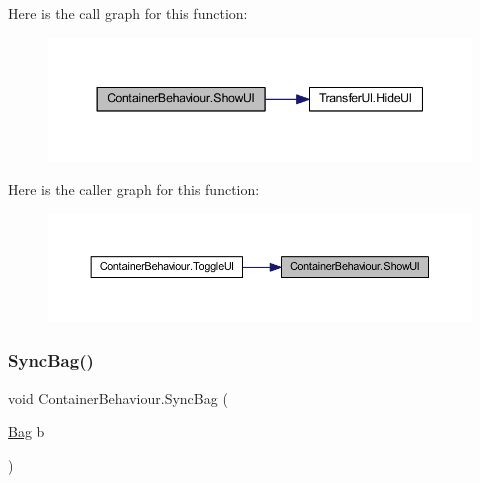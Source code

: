 Here is the call graph for this function\+:\nopagebreak
\begin{figure}[H]
\begin{center}
\leavevmode
\includegraphics[width=344pt]{class_container_behaviour_ae4733d72cba5780939349f6d9beeba8f_cgraph}
\end{center}
\end{figure}
Here is the caller graph for this function\+:\nopagebreak
\begin{figure}[H]
\begin{center}
\leavevmode
\includegraphics[width=350pt]{class_container_behaviour_ae4733d72cba5780939349f6d9beeba8f_icgraph}
\end{center}
\end{figure}
\mbox{\label{class_container_behaviour_aea3c37f67bc244516f307f2c59a27b8f}} 
\subsubsection{\texorpdfstring{SyncBag()}{SyncBag()}}
{\footnotesize\ttfamily void Container\+Behaviour.\+Sync\+Bag (\begin{DoxyParamCaption}\item[{\mbox{\hyperlink{class_bag}{Bag}}}]{b }\end{DoxyParamCaption})}

